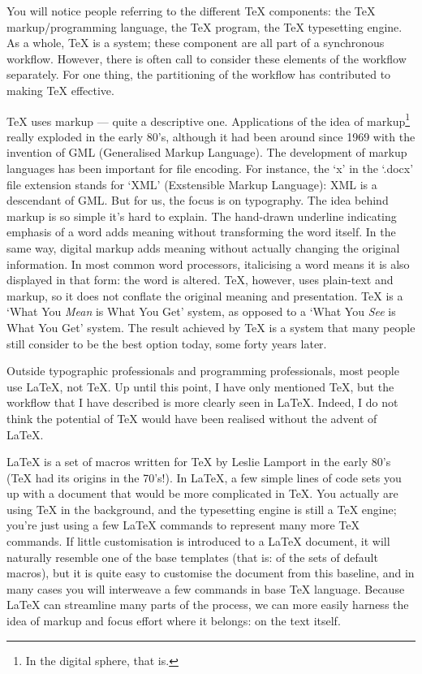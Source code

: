 \documentclass[11pt, oneside]{memoir}
\begin{document}
You will notice people referring to the different TeX components: the TeX markup/programming language, the TeX program, the TeX typesetting engine. As a whole, TeX is a system; these component are all part of a synchronous workflow. However, there is often call to consider these elements of the workflow separately. For one thing, the partitioning of the workflow has contributed to making TeX effective.

TeX uses markup — quite a descriptive one. Applications of the idea of markup\footnote{In the digital sphere, that is.} really exploded in the early 80's, although it had been around since 1969 with the invention of GML (Generalised Markup Language). The development of markup languages has been important for file encoding. For instance, the `x' in the `.docx' file extension stands for `XML' (Exstensible Markup Language): XML is a descendant of GML. But for us, the focus is on typography. The idea behind markup is so simple it's hard to explain. The hand-drawn underline indicating emphasis of a word adds meaning without transforming the word itself. In the same way, digital markup adds meaning without actually changing the original information. In most common word processors, italicising a word means it is also displayed in that form: the word is altered. TeX, however, uses plain-text and markup, so it does not conflate the original meaning and presentation. TeX is a `What You \emph{Mean} is What You Get' system, as opposed to a `What You \emph{See} is What You Get' system. The result achieved by TeX is a system that many people still consider to be the best option today, some forty years later.

Outside typographic professionals and programming professionals, most people use \LaTeX{}, not \TeX{}. Up until this point, I have only mentioned TeX, but the workflow that I have described is more clearly seen in LaTeX. Indeed, I do not think the potential of TeX would have been realised without the advent of LaTeX.

LaTeX is a set of macros written for TeX by Leslie Lamport in the early 80's (TeX had its origins in the 70's!). In LaTeX, a few simple lines of code sets you up with a document that would be more complicated in TeX. You actually are using TeX in the background, and the typesetting engine is still a TeX engine; you're just using a few LaTeX commands to represent many more TeX commands. If little customisation is introduced to a LaTeX document, it will naturally resemble one of the base templates (that is: of the sets of default macros), but it is quite easy to customise the document from this baseline, and in many cases you will interweave a few commands in base TeX language. Because LaTeX can streamline many parts of the process, we can more easily harness the idea of markup and focus effort where it belongs: on the text itself.
\end{document}
